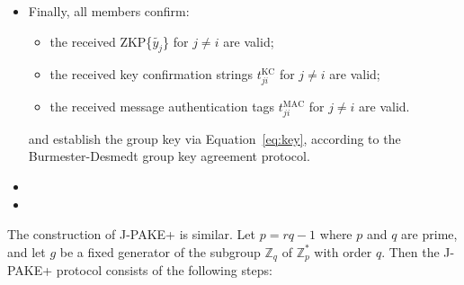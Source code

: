 \begin{itemize}
    \item[]  Finally, all members confirm:
    \begin{itemize}
            \item the received ZKP\{$\tilde{y_j}$\} for $j \neq i$ are valid;
            \item the received key confirmation strings $t^{\text{KC}}_{ji}$ for $j \neq i$ are valid;
            \item the received message authentication tags $t^{\text{MAC}}_{ji}$ for $j \neq i$ are valid.
        \end{itemize}
        and establish the group key via Equation~\eqref{eq:key}, according to the Burmester-Desmedt group key agreement protocol.
        \item[]
        \item[]
\end{itemize}

The construction of J-PAKE+ is similar.  Let $p = rq - 1$ where $p$ and $q$ are prime, and let $g$ be a fixed generator of the subgroup $\mathbb{Z}_q$ of $\mathbb{Z}_p^*$ with order $q$.  Then the J-PAKE+ protocol consists of the following steps:
\\

